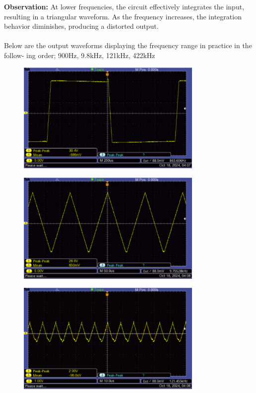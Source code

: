 \documentclass{article}
\begin{document}
\textbf{Observation:}
At lower frequencies, the circuit effectively integrates the input, 
resulting in a triangular waveform. As the frequency increases, the 
integration behavior diminishes, producing a distorted output.
\\ \\ 

Below are the output waveforms displaying the frequency range in practice in the follow-
ing order; 900Hz, 9.8kHz, 121kHz, 422kHz

\begin{figure}[H]
    \centering
    \includegraphics[width=0.8\textwidth]{img/Lab 8/1_2.png} %
    \caption{}
\end{figure}

\begin{figure}[H]
    \centering
    \includegraphics[width=0.8\textwidth]{img/Lab 8/1_3.png} %
    \caption{}
\end{figure}

\begin{figure}[H]
    \centering
    \includegraphics[width=0.8\textwidth]{img/Lab 8/1_4.png} %
    \caption{}
\end{figure}
\end{document}
